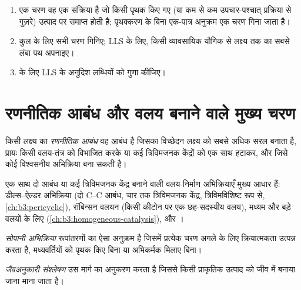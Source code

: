 \begin{method}[चरण गिनना]\label{met:b3:total-synthesis:count}
\begin{enumerate}
  \item एक चरण वह एक संक्रिया है जो किसी पृथक किए गए (या कम से कम उपचार-पश्चात् प्रक्रिया से गुज़रे)
        उत्पाद पर समाप्त होती है; पृथक्करण के बिना एक-पात्र अनुक्रम एक चरण गिना जाता है।
  \item कुल के लिए सभी चरण गिनिए; LLS के लिए, किसी
        व्यावसायिक यौगिक से लक्ष्य तक का सबसे लंबा पथ अपनाइए।
  \item {} के लिए LLS के अनुदिश लब्धियों को गुणा कीजिए।
\end{enumerate}
\end{method}

\section{रणनीतिक आबंध और वलय बनाने वाले मुख्य चरण}

\begin{definition}[रणनीतिक आबंध]\label{def:b3:total-synthesis:strategic-bond}
किसी लक्ष्य का \emph{रणनीतिक आबंध} वह आबंध है जिसका
विच्छेदन लक्ष्य को सबसे अधिक सरल बनाता है, प्रायः किसी वलय-तंत्र को विभाजित करके
या कई त्रिविमजनक केंद्रों को एक साथ हटाकर, और जिसे कोई विश्वसनीय अभिक्रिया
बना सकती है।
\end{definition}

एक साथ दो आबंध या कई त्रिविमजनक केंद्र बनाने वाली वलय-निर्माण अभिक्रियाएँ
मुख्य आधार हैं: डील्स--ऐल्डर अभिक्रिया (दो C--C आबंध, चार तक
त्रिविमजनक केंद्र, त्रिविमविशिष्ट रूप से, \cref{ch:b3:pericyclic}), रॉबिन्सन
वलयन (किसी कीटोन पर एक छह-सदस्यीय वलय), मध्यम और बड़े वलयों के लिए 
(\cref{ch:b3:homogeneous-catalysis}), और ।

\begin{definition}[सोपानी अभिक्रिया]\label{def:b3:total-synthesis:cascade}
\emph{सोपानी अभिक्रिया} रूपांतरणों का ऐसा
अनुक्रम है जिसमें प्रत्येक चरण अगले के लिए क्रियात्मकता उत्पन्न करता है,
मध्यवर्तियों को पृथक किए बिना या अभिकर्मक मिलाए बिना।
\end{definition}

\begin{definition}[जैवअनुकारी संश्लेषण]\label{def:b3:total-synthesis:biomimetic}
\emph{जैवअनुकारी संश्लेषण} उस मार्ग का अनुकरण करता है
जिससे किसी प्राकृतिक उत्पाद को जीव में बनाया जाना माना जाता है।
\end{definition}

